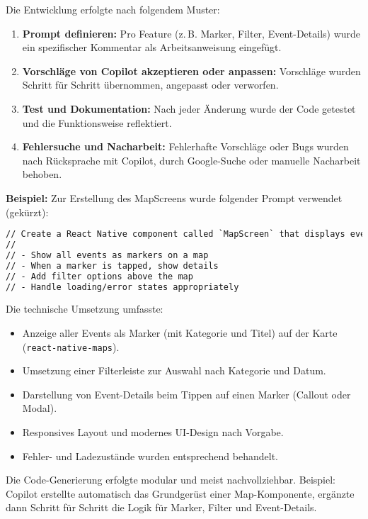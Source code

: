 Die Entwicklung erfolgte nach folgendem Muster:
\begin{enumerate}
    \item \textbf{Prompt definieren:} Pro Feature (z.\,B. Marker, Filter, Event-Details) wurde ein spezifischer Kommentar als Arbeitsanweisung eingefügt.
    \item \textbf{Vorschläge von Copilot akzeptieren oder anpassen:} Vorschläge wurden Schritt für Schritt übernommen, angepasst oder verworfen.
    \item \textbf{Test und Dokumentation:} Nach jeder Änderung wurde der Code getestet und die Funktionsweise reflektiert.
    \item \textbf{Fehlersuche und Nacharbeit:} Fehlerhafte Vorschläge oder Bugs wurden nach Rücksprache mit Copilot, durch Google-Suche oder manuelle Nacharbeit behoben.
\end{enumerate}

\textbf{Beispiel:}
Zur Erstellung des MapScreens wurde folgender Prompt verwendet (gekürzt):

\begin{lstlisting}[language=HTML]
// Create a React Native component called `MapScreen` that displays event markers on a map using event data from the `EventsProvider` context. Requirements:
//
// - Show all events as markers on a map
// - When a marker is tapped, show details
// - Add filter options above the map
// - Handle loading/error states appropriately
\end{lstlisting}

Die technische Umsetzung umfasste:
\begin{itemize}
    \item Anzeige aller Events als Marker (mit Kategorie und Titel) auf der Karte
          (\texttt{react-native-maps}).
    \item Umsetzung einer Filterleiste zur Auswahl nach Kategorie und Datum.
    \item Darstellung von Event-Details beim Tippen auf einen Marker (Callout oder
          Modal).
    \item Responsives Layout und modernes UI-Design nach Vorgabe.
    \item Fehler- und Ladezustände wurden entsprechend behandelt.
\end{itemize}

Die Code-Generierung erfolgte modular und meist nachvollziehbar. Beispiel:
Copilot erstellte automatisch das Grundgerüst einer Map-Komponente, ergänzte
dann Schritt für Schritt die Logik für Marker, Filter und Event-Details.

